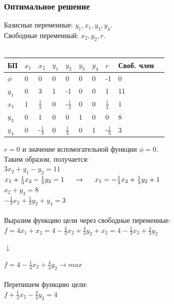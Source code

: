 \documentclass[14pt,a4paper,fleqn]{extarticle}
\begin{document}
\subsubsection*{Оптимальное решение}
Базисные переменные: $y_1, x_1, y_3, y_4$.\\
Свободные переменный: $x_2, y_2, r$.\\\\
\begin{tabularx}{\textwidth}{|p{1cm}|p{1cm}|p{1cm}|p{1cm}|p{1cm}|p{1cm}|p{1cm}|p{1.2cm}|p{1.2cm}|c}
	\hline
	БП & $x_1$ & $x_2$ & $y_1$ & $y_2$ & $y_3$ & $y_4$ & $r$ & Своб. член & \\
	\hline
	
	$\phi$ & 0 & 0 & 0 & 0 & 0 & 0 & -1 & 0 & \\
	
	\hline
	
	$y_1$ & 0 & 3 & 1 & -1 & 0 & 0 & 1 & 11 & \\
	
	\hline
	
	$x_1$ & 1 & \small $\frac{1}{3}$ & 0 & \small -$\frac{1}{3}$ & 0 & 0 & \small $\frac{1}{3}$ & 1 & \\
	
	\hline
	$y_3$ & 0 & 1 & 0 & 0 & 1 & 0 & 0 & 8 & \\
	
	\hline
	$y_4$ & 0 & \small -$\frac{1}{3}$ & 0 & \small $\frac{1}{3}$ & 0 & 1 & \small -$\frac{1}{3}$ & 3 & \\
	\hline
\end{tabularx}
\newline\newline
$r = 0$ и значение вспомогательной функции $\phi = 0$.\\
Таким образом, получается:\\
$3x_2 + y_1 - y_2 = 11$\\
$x_1 + \frac{1}{3}x_2 - \frac{1}{3}y_2 = 1 \hspace*{0.5cm} \rightarrow \hspace*{0.5cm} x_1 = - \frac{1}{3}x_2 + \frac{1}{3}y_2 + 1 $\\
$x_2 + y_3 = 8$\\
$-\frac{1}{3}x_2 + \frac{1}{3}y_2 + y_4 = 3$\\\\
Выразим функцию цели через свободные переменные:\\
$f = 4x_1 + x_2 = 4-\frac{4}{3}x_2 + \frac{4}{3}y_2 + x_2 = 4 - \frac{1}{3}x_2 + \frac{4}{3}y_2$
\begin{center}$\downarrow$\end{center}
$f = 4 - \frac{1}{3}x_2 + \frac{4}{3}y_2 \longrightarrow max$\\\\
Перепишем функцию цели:\\
$f + \frac{1}{3}x_2 - \frac{4}{3}y_2 = 4$
\newpage
\end{document}
